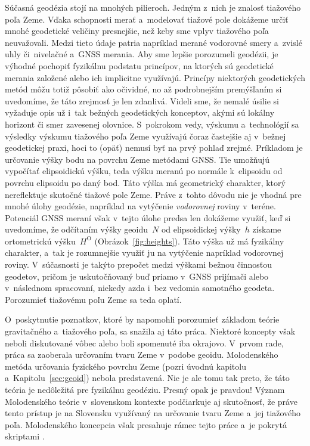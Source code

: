 \documentclass[a4paper, 12pt]{book}
\begin{document}
Súčasná geodézia stojí na mnohých pilieroch.  Jedným z~nich je znalosť 
tiažového poľa Zeme.  Vďaka schopnosti merať a~modelovať tiažové pole dokážeme 
určiť mnohé geodetické veličiny presnejšie, než keby sme vplyv tiažového poľa 
neuvažovali.  Medzi tieto údaje patria napríklad merané vodorovné smery 
a~zvislé uhly či~nivelačné a~GNSS merania.  Aby sme lepšie porozumeli geodézii, 
je výhodné pochopiť fyzikálnu podstatu princípov, na ktorých sú geodetické 
merania založené alebo ich implicitne využívajú.  Princípy niektorých 
geodetických metód môžu totiž pôsobiť ako očividné, no až podrobnejším 
premýšľaním si uvedomíme, že táto zrejmosť je len zdanlivá.  Videli sme, že 
nemalé úsilie si vyžaduje opis už i~tak bežných geodetických konceptov, akými 
sú lokálny horizont či smer zavesenej olovnice.  S~pokrokom vedy, výskumu 
a~technológií sa výsledky výskumu tiažového poľa Zeme využívajú čoraz častejšie 
aj v~bežnej geodetickej praxi, hoci to (opäť) nemusí byť na prvý pohlaď zrejmé.  
Príkladom je určovanie výšky bodu na povrchu Zeme metódami GNSS.  Tie umožňujú 
vypočítať elipsoidickú výšku, teda výšku meranú po normále k~elipsoidu od 
povrchu elipsoidu po daný bod.  Táto výška má geometrický charakter, ktorý 
nereflektuje skutočné tiažové pole Zeme.  Práve z~tohto dôvodu nie je vhodná 
pre mnohé úlohy geodézie, napríklad na vytýčenie \emph{vodorovnej} roviny 
v~teréne.  Potenciál GNSS meraní však v~tejto úlohe predsa len dokážeme využiť, 
keď si uvedomíme, že odčítaním výšky geoidu~$N$ od elipsoidickej výšky~$h$ 
získame ortometrickú výšku~$H^\mathrm{O}$ (Obrázok~\ref{fig:heights}).  Táto 
výška už má fyzikálny charakter, a~tak je rozumnejšie využiť ju na vytýčenie 
napríklad vodorovnej roviny.  V~súčasnosti je takýto prepočet medzi výškami 
bežnou činnosťou geodetov, pričom je uskutočňovaný buď priamo v~GNSS prijímači 
alebo v~následnom spracovaní, niekedy azda i~bez vedomia samotného geodeta.  
Porozumieť tiažovému poľu Zeme sa teda oplatí.

O~poskytnutie poznatkov, ktoré by napomohli porozumieť základom teórie 
gravitačného a~tiažového poľa, sa snažila aj táto práca.  Niektoré koncepty 
však neboli diskutované vôbec alebo boli spomenuté iba okrajovo.  V~prvom rade, 
práca sa zaoberala určovaním tvaru Zeme v~podobe geoidu.  Molodenského metóda 
určovania fyzického povrchu Zeme (pozri úvodnú kapitolu 
a~Kapitolu~\ref{sec:geoid}) nebola predstavená.  Nie je ale tomu tak preto, že 
táto teória je nedôležitá pre fyzikálnu geodéziu.  Presný opak je pravdou!  
Význam Molodenského teórie v~slovenskom kontexte podčiarkuje aj skutočnosť, že 
práve tento prístup je na Slovensku využívaný na určovanie tvaru Zeme a~jej 
tiažového poľa.  Molodenského koncepcia však presahuje rámec tejto práce a~je 
pokrytá skriptami \textcite{Janak2006}.
\end{document}
